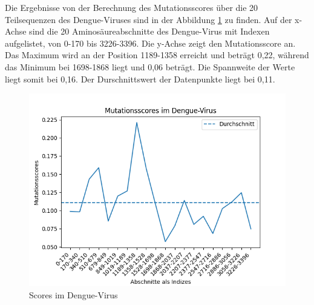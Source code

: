 \documentclass[german,version-2022-01]{uzl-thesis}
\begin{document}
Die Ergebnisse von der Berechnung des Mutationsscores \"uber die 20 Teilsequenzen des Dengue-Viruses sind in der Abbildung \ref{fig:Dengue_virus_scores} zu finden. Auf der x-Achse sind die 20 Aminos\"aureabschnitte des Dengue-Virus mit Indexen aufgelistet, von 0-170 bis 3226-3396. Die y-Achse zeigt den Mutationsscore an. Das Maximum wird an der Position 1189-1358 erreicht und betr\"agt 0,22, w\"ahrend das Minimum bei 1698-1868 liegt und 0,06 betr\"agt. Die Spannweite der Werte liegt somit bei 0,16. Der Durschnittswert der Datenpunkte liegt bei 0,11. 
\begin{figure}[tbp]
  \centering
  \includegraphics[scale=0.75]{Images/Diagramm_Scores_im_Dengue_virus.png}
  \caption{Scores im Dengue-Virus}
  \label{fig:Dengue_virus_scores}
\end{figure}
\end{document}
